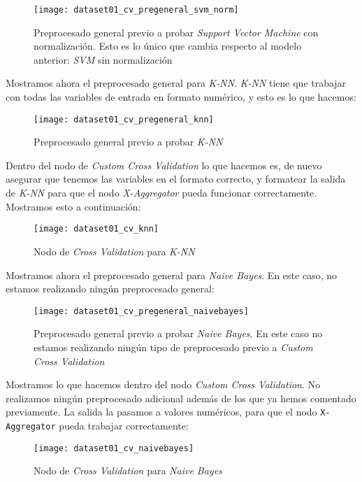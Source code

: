 \documentclass[11pt]{article}
\begin{document}
\begin{figure}[H]
    \centering
    \texttt{[image: dataset01\_cv\_pregeneral\_svm\_norm]}
    \caption{Preprocesado general previo a probar \emph{Support Vector Machine} con normalización. Esto es lo único que cambia respecto al modelo anterior: \emph{SVM} sin normalización}
\end{figure}

Mostramos ahora el preprocesado general para \emph{K-NN}. \emph{K-NN} tiene que trabajar con todas las variables de entrada en formato numérico, y esto es lo que hacemos:

\begin{figure}[H]
    \centering
    \texttt{[image: dataset01\_cv\_pregeneral\_knn]}
    \caption{Preprocesado general previo a probar \emph{K-NN}}
\end{figure}

Dentro del nodo de \emph{Custom Cross Validation} lo que hacemos es, de nuevo asegurar que tenemos las variables en el formato correcto, y formatear la salida de \emph{K-NN} para que el nodo \emph{X-Aggregator} pueda funcionar correctamente. Mostramos esto a continuación:

\begin{figure}[H]
    \centering
    \texttt{[image: dataset01\_cv\_knn]}
    \caption{Nodo de \emph{Cross Validation} para \emph{K-NN}}
\end{figure}

Mostramos ahora el preprocesado general para \emph{Naive Bayes}. En este caso, no estamos realizando ningún preprocesado general:

\begin{figure}[H]
    \centering
    \texttt{[image: dataset01\_cv\_pregeneral\_naivebayes]}
    \caption{Preprocesado general previo a probar \emph{Naive Bayes}. En este caso no estamos realizando ningún tipo de preprocesado previo a \emph{Custom Cross Validation}}
\end{figure}

Mostramos lo que hacemos dentro del nodo \emph{Custom Cross Validation}. No realizamos ningún preprocesado adicional además de los que ya hemos comentado previamente. La salida la pasamos a valores numéricos, para que el nodo \lstinline{X-Aggregator} pueda trabajar correctamente:

\begin{figure}[H]
    \centering
    \texttt{[image: dataset01\_cv\_naivebayes]}
    \caption{Nodo de \emph{Cross Validation} para \emph{Naive Bayes}}
\end{figure}
\end{document}
